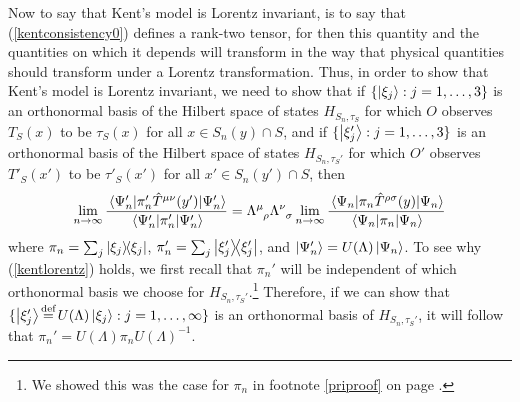Now to say that Kent's model is Lorentz invariant, is to say that (\ref{kentconsistency0}) defines a rank-two tensor, for then this quantity and the quantities on which it depends will transform in the way that physical quantities should transform under a Lorentz transformation. Thus, in order to show that Kent's model is Lorentz invariant, we need to show that if $\{\ket{\xi_j}:j=1,\ldots,3\}$ is an orthonormal basis of the Hilbert space of states $H_{S_n,\tau_S}$ for which $O$ observes $T_S(x)$ to be $\tau_S(x)$ for all $x\in S_n(y)\cap S$, and if $\{\ket{\xi_j'}:j=1,\ldots,3\}$ is an orthonormal basis of the Hilbert space of states $H_{S_n,\tau_S'}$ for which $O'$ observes $T'_S(x')$ to be $\tau'_S(x')$ for all $x'\in S_n(y')\cap S$, then
\begin{equation}\label{kentlorentz}
\lim_{n\rightarrow\infty}\frac{\ev{\pi_n'\hat{T}^{\mu\nu}(y')}{\Psi_n'}}{\ev{\pi_n'}{\Psi_n'}}=\Lambda\indices{^\mu_\rho}\Lambda\indices{^\nu_\sigma} \lim_{n\rightarrow\infty}\frac{\ev{\pi_n\hat{T}^{\rho\sigma}(y)}{\Psi_n}}{\ev{\pi_n}{\Psi_n}}
\end{equation}
where $\pi_n=\sum_j\dyad{\xi_j}$, $\pi_n'=\sum_j\dyad{\xi_j'}$, and $\ket{\Psi_n'}=U(\Lambda)\ket{\Psi_n}$. To see why (\ref{kentlorentz}) holds, we first recall that $\pi_n'$ will be independent of which orthonormal basis we choose for $H_{S_n,\tau_S'}$.\footnote{We showed this was the case for $\pi_n$ in footnote \ref{priproof} on page \pageref{priproof}.} Therefore, if we can show that $\{\ket{\xi_j'}\myeq U(\Lambda)\ket{\xi_j}:j=1,\ldots,\infty\}$ is an orthonormal basis of $H_{S_n,\tau_S'}$, it will follow that $\pi_n'=U(\Lambda)\pi_nU(\Lambda)^{-1}$. 

